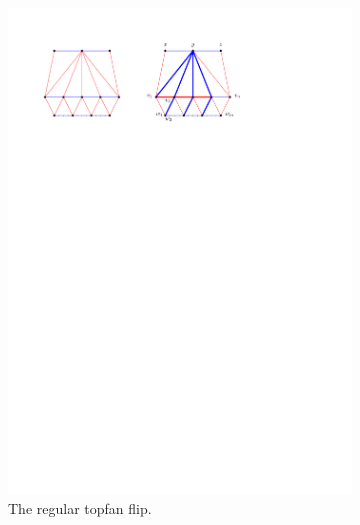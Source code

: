 

\begin{figure}[!b]
    \centering
    \begin{subfigure}[t]{0.9 \textwidth}
        \includegraphics[width = \textwidth]{topFanFlips/img/regular}
        \caption{The regular topfan flip.}
        \label{fig:fanflip:regular}
    \end{subfigure}
    ~
    \centering
    \begin{subfigure}[t]{0.45 \textwidth}

\end{subfigure}
\end{figure}
